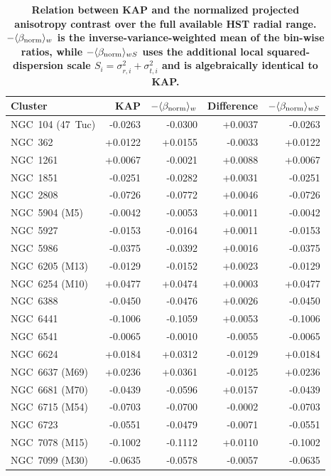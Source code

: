\begin{table}
\centering
\caption{\textbf{Relation between KAP and the normalized projected anisotropy contrast over the full available HST radial range. $-\langle\beta_{\rm norm}\rangle_w$ is the inverse-variance-weighted mean of the bin-wise ratios, while $-\langle\beta_{\rm norm}\rangle_{wS}$ uses the additional local squared-dispersion scale $S_i=\sigma_{r,i}^2+\sigma_{t,i}^2$ and is algebraically identical to KAP.}}
\label{tab:kap_beta_norm}
\small
\setlength{\tabcolsep}{5pt}
\begin{tabular}{lrrrr}
\hline
Cluster & KAP & $-\langle\beta_{\rm norm}\rangle_w$ & Difference & $-\langle\beta_{\rm norm}\rangle_{wS}$ \\
\hline
NGC~104 (47~Tuc) & -0.0263 & -0.0300 & +0.0037 & -0.0263 \\
NGC~362 & +0.0122 & +0.0155 & -0.0033 & +0.0122 \\
NGC~1261 & +0.0067 & -0.0021 & +0.0088 & +0.0067 \\
NGC~1851 & -0.0251 & -0.0282 & +0.0031 & -0.0251 \\
NGC~2808 & -0.0726 & -0.0772 & +0.0046 & -0.0726 \\
NGC~5904 (M5) & -0.0042 & -0.0053 & +0.0011 & -0.0042 \\
NGC~5927 & -0.0153 & -0.0164 & +0.0011 & -0.0153 \\
NGC~5986 & -0.0375 & -0.0392 & +0.0016 & -0.0375 \\
NGC~6205 (M13) & -0.0129 & -0.0152 & +0.0023 & -0.0129 \\
NGC~6254 (M10) & +0.0477 & +0.0474 & +0.0003 & +0.0477 \\
NGC~6388 & -0.0450 & -0.0476 & +0.0026 & -0.0450 \\
NGC~6441 & -0.1006 & -0.1059 & +0.0053 & -0.1006 \\
NGC~6541 & -0.0065 & -0.0010 & -0.0055 & -0.0065 \\
NGC~6624 & +0.0184 & +0.0312 & -0.0129 & +0.0184 \\
NGC~6637 (M69) & +0.0236 & +0.0361 & -0.0125 & +0.0236 \\
NGC~6681 (M70) & -0.0439 & -0.0596 & +0.0157 & -0.0439 \\
NGC~6715 (M54) & -0.0703 & -0.0700 & -0.0002 & -0.0703 \\
NGC~6723 & -0.0551 & -0.0479 & -0.0071 & -0.0551 \\
NGC~7078 (M15) & -0.1002 & -0.1112 & +0.0110 & -0.1002 \\
NGC~7099 (M30) & -0.0635 & -0.0578 & -0.0057 & -0.0635 \\
\hline
\end{tabular}
\end{table}